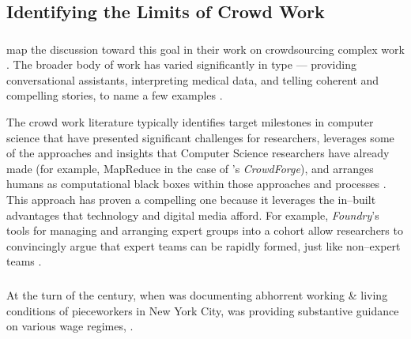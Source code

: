 \documentclass[trackingWork]{subfiles}
\begin{document}
\subsection[What are the limits of crowd work]{Identifying the Limits of Crowd Work}\label{sec:complexity}
\subsubsection{\crowdworkpers}
\citeauthor{crowdForgeKittur}
map the discussion toward this goal in their work on
crowdsourcing complex work
\cite{crowdForgeKittur}.
The broader body of work has varied significantly in type
--- providing conversational assistants,
interpreting medical data, and
telling coherent and compelling stories,
to name a few examples
\cite{Lasecki:2013:CCC:2501988.2502057,mavandadi2012distributed,KimStoria}.

The crowd work literature typically identifies target milestones in computer science
that have presented significant challenges for researchers,
leverages some of the approaches and insights that Computer Science researchers have already made
(for example, MapReduce in the case of \citeauthor{crowdForgeKittur}'s \textit{CrowdForge}),
and arranges humans as computational black boxes within those approaches and processes
\cite[][and others]{crowdForgeKittur,foundry}.
This approach has proven a compelling one because
it leverages the in--built advantages that technology and digital media afford.
For example, \textit{Foundry}'s tools for managing and arranging expert groups into a cohort
allow researchers to convincingly argue that expert teams can be rapidly formed,
just like non--expert teams
\cite{foundry}.



\subsubsection{\pieceworkpers}
At the turn of the  century,
when \citeauthor{riisOtherSideLives} was documenting abhorrent working \& living conditions of pieceworkers in New York City,
\citeauthor{norton1900textile} was providing substantive guidance on various wage regimes,
\cite{riisOtherSideLives,norton1900textile}.
\end{document}
